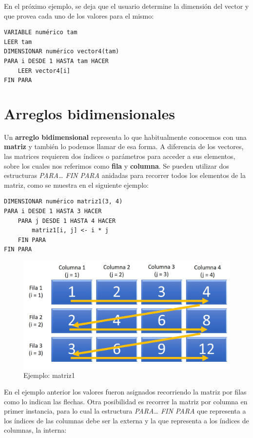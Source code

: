 \documentclass[]{book}
\begin{document}
En el próximo ejemplo, se deja que el usuario determine la dimensión del
vector y que provea cada uno de los valores para el mismo:

\begin{verbatim}
VARIABLE numérico tam
LEER tam
DIMENSIONAR numérico vector4(tam)
PARA i DESDE 1 HASTA tam HACER
    LEER vector4[i]
FIN PARA
\end{verbatim}

\section{Arreglos bidimensionales}\label{arreglos-bidimensionales}

Un \textbf{arreglo bidimensional} representa lo que habitualmente
conocemos con una \textbf{matriz} y también lo podemos llamar de esa
forma. A diferencia de los vectores, las matrices requieren dos índices
o parámetros para acceder a sus elementos, sobre los cuales nos
referimos como \textbf{fila} y \textbf{columna}. Se pueden utilizar dos
estructuras \emph{PARA\ldots{} FIN PARA} anidadas para recorrer todos
los elementos de la matriz, como se muestra en el siguiente ejemplo:

\begin{verbatim}
DIMENSIONAR numérico matriz1(3, 4)
PARA i DESDE 1 HASTA 3 HACER
    PARA j DESDE 1 HASTA 4 HACER
        matriz1[i, j] <- i * j
    FIN PARA
FIN PARA
\end{verbatim}

\begin{figure}

{\centering \includegraphics[width=0.8\linewidth]{images/13_matriz1} 

}

\caption{Ejemplo: matriz1}\label{fig:matriz1}
\end{figure}

En el ejemplo anterior los valores fueron asignados recorriendo la
matriz por filas como lo indican las flechas. Otra posibilidad es
recorrer la matriz por columna en primer instancia, para lo cual la
estructura \emph{PARA\ldots{} FIN PARA} que representa a los índices de
las columnas debe ser la externa y la que representa a los índices de
columnas, la interna:
\end{document}
